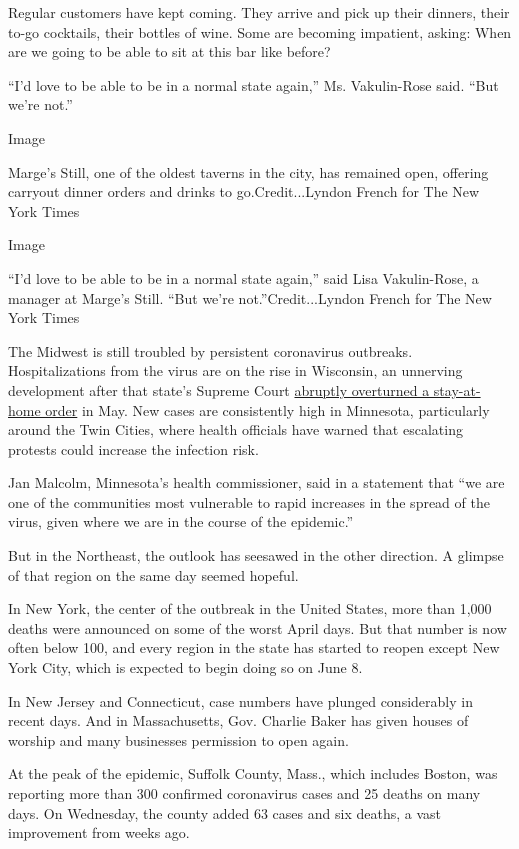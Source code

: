 Regular customers have kept coming. They arrive and pick up their
dinners, their to-go cocktails, their bottles of wine. Some are becoming
impatient, asking: When are we going to be able to sit at this bar like
before?

``I'd love to be able to be in a normal state again,'' Ms. Vakulin-Rose
said. ``But we're not.''

Image

Marge's Still, one of the oldest taverns in the city, has remained open,
offering carryout dinner orders and drinks to go.Credit...Lyndon French
for The New York Times

Image

``I'd love to be able to be in a normal state again,'' said Lisa
Vakulin-Rose, a manager at Marge's Still. ``But we're
not.''Credit...Lyndon French for The New York Times

The Midwest is still troubled by persistent coronavirus outbreaks.
Hospitalizations from the virus are on the rise in Wisconsin, an
unnerving development after that state's Supreme Court
\href{https://www.nytimes3xbfgragh.onion/2020/05/13/us/coronavirus-wisconsin-supreme-court.html}{abruptly
overturned a stay-at-home order} in May. New cases are consistently high
in Minnesota, particularly around the Twin Cities, where health
officials have warned that escalating protests could increase the
infection risk.

Jan Malcolm, Minnesota's health commissioner, said in a statement that
``we are one of the communities most vulnerable to rapid increases in
the spread of the virus, given where we are in the course of the
epidemic.''

But in the Northeast, the outlook has seesawed in the other direction. A
glimpse of that region on the same day seemed hopeful.

In New York, the center of the outbreak in the United States, more than
1,000 deaths were announced on some of the worst April days. But that
number is now often below 100, and every region in the state has started
to reopen except New York City, which is expected to begin doing so on
June 8.

In New Jersey and Connecticut, case numbers have plunged considerably in
recent days. And in Massachusetts, Gov. Charlie Baker has given houses
of worship and many businesses permission to open again.

At the peak of the epidemic, Suffolk County, Mass., which includes
Boston, was reporting more than 300 confirmed coronavirus cases and 25
deaths on many days. On Wednesday, the county added 63 cases and six
deaths, a vast improvement from weeks ago.

